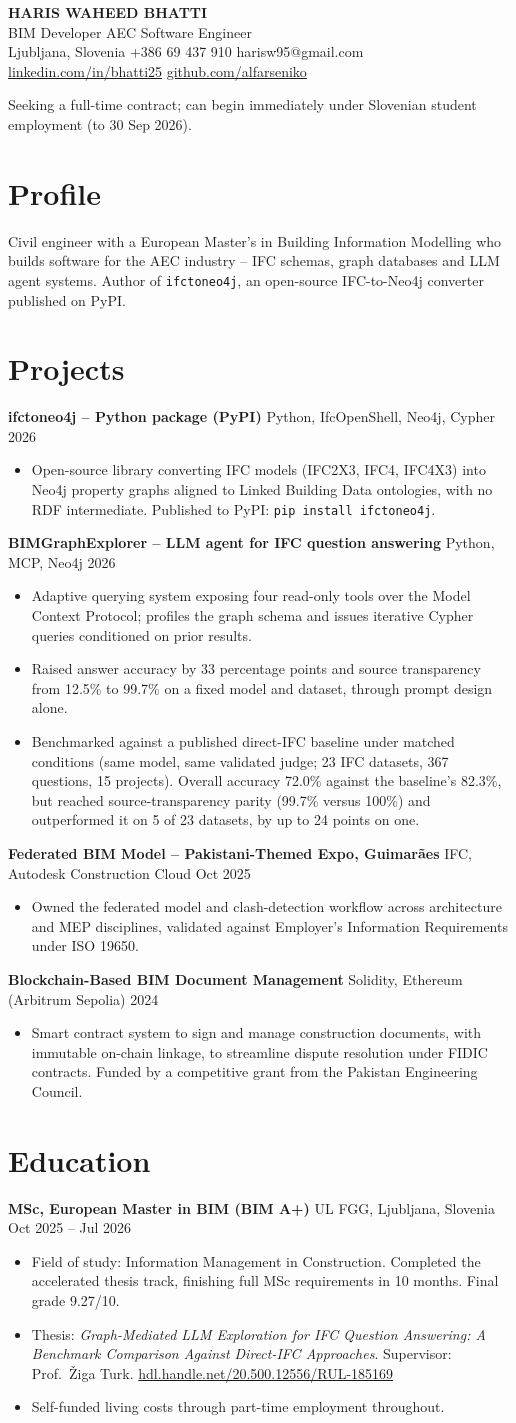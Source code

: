 \documentclass[a4paper,10.5pt]{article}
\newcommand{\datefill}{\dotfill}
\newcommand{\entry}[3]{\vspace{2.5pt}\noindent\textbf{#1} \textbar{} #2 \datefill{} #3\par\vspace{0.5pt}}
\newcommand{\ROLELINE}{BIM Developer \textbar{} AEC Software Engineer}
\newcommand{\projIfcToNeo}{%
\entry{ifctoneo4j -- Python package (PyPI)}{Python, IfcOpenShell, Neo4j, Cypher}{2026}
\begin{itemize}
  \item Open-source library converting IFC models (IFC2X3, IFC4, IFC4X3) into Neo4j
        property graphs aligned to Linked Building Data ontologies, with no RDF
        intermediate. Published to PyPI: \texttt{pip install ifctoneo4j}.
\end{itemize}}
\newcommand{\projBIMGraph}{%
\entry{BIMGraphExplorer -- LLM agent for IFC question answering}{Python, MCP, Neo4j}{2026}
\begin{itemize}
  \item Adaptive querying system exposing four read-only tools over the Model
        Context Protocol; profiles the graph schema and issues iterative Cypher
        queries conditioned on prior results.
  \item Raised answer accuracy by 33 percentage points and source transparency from
        12.5\% to 99.7\% on a fixed model and dataset, through prompt design alone.
  \item Benchmarked against a published direct-IFC baseline under matched
        conditions (same model, same validated judge; 23 IFC datasets, 367
        questions, 15 projects). Overall accuracy 72.0\% against the baseline's
        82.3\%, but reached source-transparency parity (99.7\% versus 100\%) and
        outperformed it on 5 of 23 datasets, by up to 24 points on one.
\end{itemize}}
\newcommand{\projGuimaraes}{%
\entry{Federated BIM Model -- Pakistani-Themed Expo, Guimar\~aes}{IFC, Autodesk Construction Cloud}{Oct 2025}
\begin{itemize}
  \item Owned the federated model and clash-detection workflow across architecture
        and MEP disciplines, validated against Employer's Information Requirements
        under ISO 19650.
\end{itemize}}
\newcommand{\projBlockchain}{%
\entry{Blockchain-Based BIM Document Management}{Solidity, Ethereum (Arbitrum Sepolia)}{2024}
\begin{itemize}
  \item Smart contract system to sign and manage construction documents, with
        immutable on-chain linkage, to streamline dispute resolution under FIDIC
        contracts. Funded by a competitive grant from the
        Pakistan Engineering Council.
\end{itemize}}
\begin{document}
\begin{center}
  {\LARGE\bfseries HARIS WAHEED BHATTI}\\[2pt]
  {\large \ROLELINE}\\[3pt]
  Ljubljana, Slovenia \textbar{} +386 69 437 910 \textbar{} harisw95@gmail.com\\
  \href{https://linkedin.com/in/bhatti25}{linkedin.com/in/bhatti25} \textbar{}
  \href{https://github.com/alfarseniko}{github.com/alfarseniko}
\end{center}
\vspace{-4pt}
\noindent\small Seeking a full-time contract; can begin immediately under Slovenian student employment (to 30 Sep 2026).\normalsize

\section{Profile}

\noindent Civil engineer with a European Master's in Building Information Modelling
who builds software for the AEC industry -- IFC schemas, graph databases and LLM
agent systems. Author of \texttt{ifctoneo4j}, an open-source IFC-to-Neo4j converter
published on PyPI.

\section{Projects}
   \projIfcToNeo \projBIMGraph \projGuimaraes \projBlockchain 

\section{Education}
\entry{MSc, European Master in BIM (BIM A+)}{UL FGG, Ljubljana, Slovenia}{Oct 2025 -- Jul 2026}
\begin{itemize}
  \item Field of study: Information Management in Construction. Completed the
        accelerated thesis track, finishing full MSc requirements in 10 months.
        Final grade 9.27/10.
  \item Thesis: \textit{Graph-Mediated LLM Exploration for IFC Question Answering:
        A Benchmark Comparison Against Direct-IFC Approaches}. Supervisor:
        Prof.~\v{Z}iga Turk. \href{http://hdl.handle.net/20.500.12556/RUL-185169}{hdl.handle.net/20.500.12556/RUL-185169}
  \item Self-funded living costs through part-time employment throughout.
\end{itemize}
\end{document}
